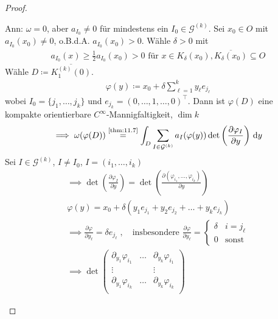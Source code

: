 \documentclass[a4paper,10pt]{scrbook}
\begin{document}
\begin{theorem}[Satz]
  \begin{proof}
    \begin{enum-arab}
      \item Ann: $\omega = 0$, aber $a_{I_0} \neq 0$ für mindestens ein $I_0 \in \mathcal{G}^{(k)}$. Sei $x_0 \in O$ mit $a_{I_0} (x_0) \neq 0$, o.B.d.A. $a_{I_0}(x_0) > 0$. Wähle $\delta > 0$ mit
      \begin{align*}
        a_{I_0} (x) \geq \frac{1}{2} a_{I_0}(x_0) > 0 \text{ für } x \in K_\delta(x_0), \overline{K_\delta(x_0)} \subseteq O
      \end{align*}
      Wähle $D \coloneq \overline{K_1^{(k)}(0)}$.
      \begin{align*}
        \varphi(y) \coloneq x_0 + \delta \sum\limits_{\ell=1}^{k} y_\ell e_{j_\ell}
      \end{align*}
      wobei $I_0 = \{ j_1,\ldots,j_k \}$ und $e_{j_k} = (0,\ldots,1,\ldots,0)^\top$. Dann ist $\varphi(D)$ eine kompakte orientierbare $C^\infty$-Mannigfaltigkeit, $\dim k$
      \begin{align*}
        \implies \omega(\varphi(D)) \overset{\text{\ref{thm:11.7}}}{=} \int_D \sum\limits_{I \in \mathcal{G}^{(k)}} a_I(\varphi(y)) \det\left( \frac{\partial \varphi_I}{\partial y} \right) \, \mathrm{d}y
      \end{align*}
      Sei $I \in \mathcal{G}^{(k)}$, $I \neq I_0$, $I = (i_1,\ldots,i_k)$
      \begin{gather*}
        \implies \det\left( \frac{\partial \varphi_I}{\partial y} \right) = \det\left( \frac{\partial (\varphi_{i_1} ,\ldots,\varphi_{i_k})}{\partial y} \right) \\
        \varphi(y) = x_0 + \delta(y_1 e_{j_1} + y_2 e_{j_2} + \ldots + y_k e_{j_k}) \\
        \implies \frac{\partial \varphi}{\partial y_\ell} = \delta e_{j_\ell} \; , \quad \text{insbesondere }
        \frac{\partial \varphi}{\partial y_\ell} =
        \begin{cases}
          \delta & i = j_\ell \\
          0 & \text{sonst}
        \end{cases} \\
        \implies \det
        \begin{pmatrix}
          \partial_{y_1} \varphi_{i_1} & \ldots & \partial_{y_k} \varphi_{i_1} \\
          \vdots & & \vdots \\
          \partial_{y_1} \varphi_{i_k} & \ldots & \partial_{y_k} \varphi_{i_k} \\

\end{pmatrix}
\end{gather*}
\end{enum-arab}
\end{proof}
\end{theorem}
\end{document}
